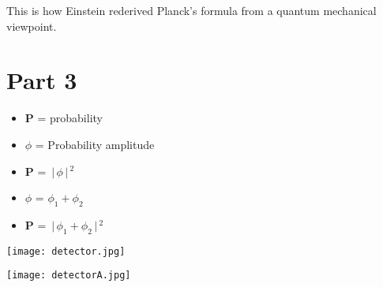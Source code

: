 \documentclass[aspectratio=169]{beamer}
\begin{document}
\begin{frame}{}

	{\Large This is how Einstein rederived Planck's formula from a quantum mechanical viewpoint.}
		
\end{frame}

\section{\textbf{Part 3}}

\begin{frame}{}

	\begin{itemize}

		\item \textbf{P} = probability\newline
		\item $ \phi $ = Probability amplitude \newline
		\item \textbf{P} = $ \,\Bigr\rvert\,\phi \,\Bigr\rvert\,^{2} $ 
		
	\end{itemize}
	
\end{frame}

\begin{frame}{}

	\begin{itemize}

		\item $ \phi $ = $ \phi_{1} + \phi_{2} $ \newline
		\item \textbf{P} = $ \,\Bigr\rvert\,\phi_{1} + \phi_{2} \,\Bigr\rvert\,^{2} $ 
	
	\end{itemize}
	
\end{frame}

\begin{frame}

	\begin{multicols}{2}
	
	\begin{center}
	
	\texttt{[image: detector.jpg]} 

	\end{center}
 
	\columnbreak
	

\begin{center}

\texttt{[image: detectorA.jpg]}

\end{center}

	\end{multicols}


\end{frame}
\end{document}
